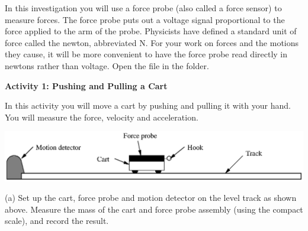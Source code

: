 In this investigation you will use a force probe (also called a force sensor) to measure forces. The force probe puts out a voltage signal proportional to the force applied to the arm of the probe. Physicists have defined a standard unit of force called the newton, abbreviated N. For your work on forces and the motions they cause, it will be more convenient to have the force probe read directly in newtons rather than voltage. 
Open the  file in the \filename{\coursefolder} folder.

%

\textbf{Activity 1: Pushing and Pulling a Cart} 

In this activity you will move a cart by pushing and pulling it with your hand.
You will measure the force, velocity and acceleration. 

\vspace{-0.2cm}
{\par\centering \includegraphics{force1/force1_fig1.eps} \par}

(a) Set up the cart, force probe and motion detector on the level track as shown above. 
Measure the mass of the cart and force probe assembly (using the compact scale), and record the result.
\answerspace{10mm}



